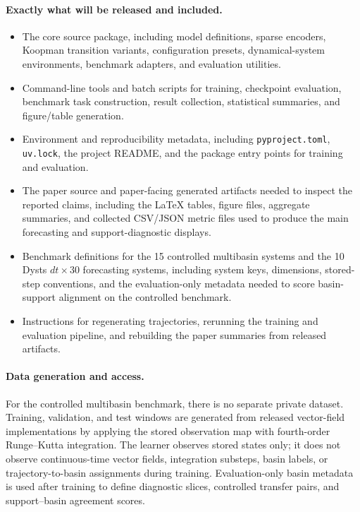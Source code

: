 \paragraph{Exactly what will be released and included.}
\begin{itemize}
  \item The core source package, including model definitions, sparse encoders,
  Koopman transition variants, configuration presets, dynamical-system
  environments, benchmark adapters, and evaluation utilities.
  \item Command-line tools and batch scripts for training, checkpoint
  evaluation, benchmark task construction, result collection, statistical
  summaries, and figure/table generation.
  \item Environment and reproducibility metadata, including
  \texttt{pyproject.toml}, \texttt{uv.lock}, the project README, and the
  package entry points for training and evaluation.
  \item The paper source and paper-facing generated artifacts needed to inspect
  the reported claims, including the LaTeX tables, figure files, aggregate
  summaries, and collected CSV/JSON metric files used to produce the main
  forecasting and support-diagnostic displays.
  \item Benchmark definitions for the 15 controlled multibasin systems and the
  10 Dysts \(dt{\times}30\) forecasting systems, including system keys,
  dimensions, stored-step conventions, and the evaluation-only metadata needed
  to score basin-support alignment on the controlled benchmark.
  \item Instructions for regenerating trajectories, rerunning the training and
  evaluation pipeline, and rebuilding the paper summaries from released
  artifacts.
\end{itemize}

\paragraph{Data generation and access.}
For the controlled multibasin benchmark, there is no separate private dataset.
Training, validation, and test windows are generated from released vector-field
implementations by applying the stored observation map with fourth-order
Runge--Kutta integration. The learner observes stored states only; it does not
observe continuous-time vector fields, integration substeps, basin labels, or
trajectory-to-basin assignments during training. Evaluation-only basin metadata
is used after training to define diagnostic slices, controlled transfer pairs,
and support--basin agreement scores.

